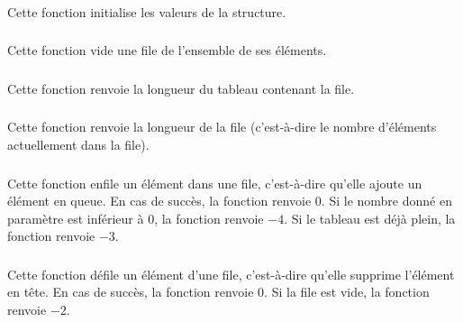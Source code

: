 \subsubsection*{}

\noindent Cette fonction initialise les valeurs de la structure.


\subsubsection*{}

\noindent Cette fonction vide une file de l'ensemble de ses éléments.


\subsubsection*{}

\noindent Cette fonction renvoie la longueur du tableau contenant la file.


\subsubsection*{}

\noindent Cette fonction renvoie la longueur de la file (c'est-à-dire le nombre d'éléments actuellement dans la file).


\subsubsection*{}

\noindent Cette fonction enfile un élément dans une file, c'est-à-dire qu'elle ajoute un élément en queue.
En cas de succès, la fonction renvoie $ 0 $.
Si le nombre donné en paramètre est inférieur à $ 0 $, la fonction renvoie $ -4 $.
Si le tableau est déjà plein, la fonction renvoie $ -3 $.


\subsubsection*{}

\noindent Cette fonction défile un élément d'une file, c'est-à-dire qu'elle supprime l'élément en tête.
En cas de succès, la fonction renvoie $ 0 $.
Si la file est vide, la fonction renvoie $ -2 $.


